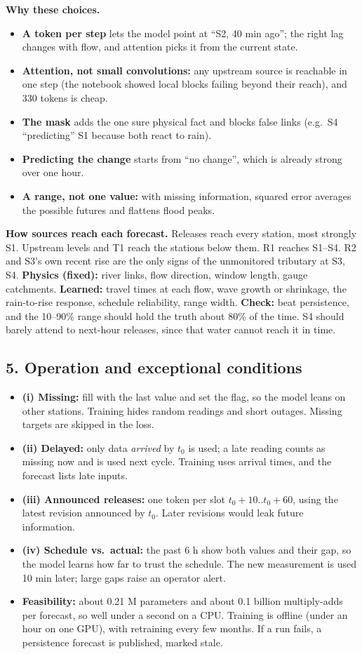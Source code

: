 \documentclass[10pt,a4paper]{article}
\begin{document}
\textbf{Why these choices.}
\begin{itemize}
\item \textbf{A token per step} lets the model point at ``S2, 40 min ago''; the right lag changes with flow, and attention picks it from the current state.
\item \textbf{Attention, not small convolutions:} any upstream source is reachable in one step (the notebook showed local blocks failing beyond their reach), and 330 tokens is cheap.
\item \textbf{The mask} adds the one sure physical fact and blocks false links (e.g.\ S4 ``predicting'' S1 because both react to rain).
\item \textbf{Predicting the change} starts from ``no change'', which is already strong over one hour.
\item \textbf{A range, not one value:} with missing information, squared error averages the possible futures and flattens flood peaks.
\end{itemize}
\textbf{How sources reach each forecast.} Releases reach every station, most strongly S1. Upstream levels and T1 reach the stations below them. R1 reaches S1--S4. R2 and S3's own recent rise are the only signs of the unmonitored tributary at S3, S4. \textbf{Physics (fixed):} river links, flow direction, window length, gauge catchments. \textbf{Learned:} travel times at each flow, wave growth or shrinkage, the rain-to-rise response, schedule reliability, range width. \textbf{Check:} beat persistence, and the 10--90\% range should hold the truth about 80\% of the time. S4 should barely attend to next-hour releases, since that water cannot reach it in time.

\subsection{5. Operation and exceptional conditions}
\begin{itemize}
\item \textbf{(i) Missing:} fill with the last value and set the flag, so the model leans on other stations. Training hides random readings and short outages. Missing targets are skipped in the loss.
\item \textbf{(ii) Delayed:} only data \emph{arrived} by $t_0$ is used; a late reading counts as missing now and is used next cycle. Training uses arrival times, and the forecast lists late inputs.
\item \textbf{(iii) Announced releases:} one token per slot $t_0+10..t_0+60$, using the latest revision announced by $t_0$. Later revisions would leak future information.
\item \textbf{(iv) Schedule vs.\ actual:} the past 6 h show both values and their gap, so the model learns how far to trust the schedule. The new measurement is used 10 min later; large gaps raise an operator alert.
\item \textbf{Feasibility:} about 0.21 M parameters and about 0.1 billion multiply-adds per forecast, so well under a second on a CPU. Training is offline (under an hour on one GPU), with retraining every few months. If a run fails, a persistence forecast is published, marked stale.
\end{itemize}
\end{document}
